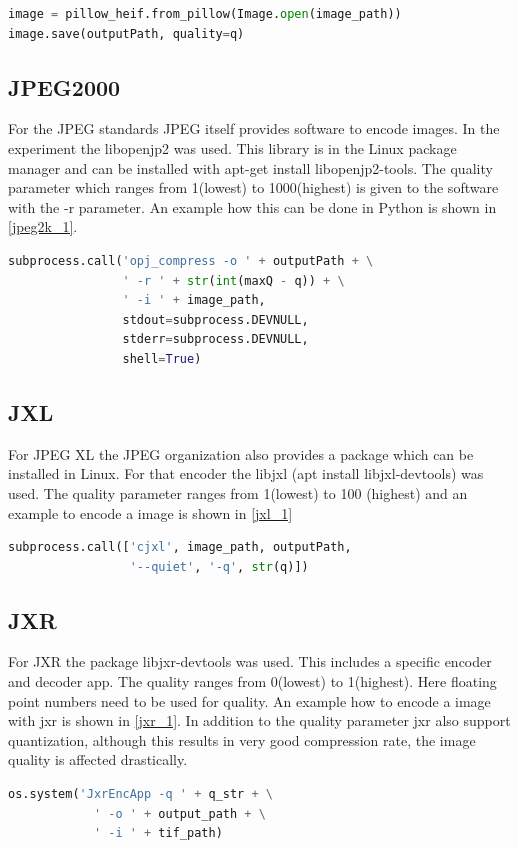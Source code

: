 \documentclass{article}
\begin{document}
\begin{lstlisting}[label={heic_1}, language=Python, caption=Encode HEIC]
image = pillow_heif.from_pillow(Image.open(image_path))
image.save(outputPath, quality=q)
\end{lstlisting}

\subsection{JPEG2000}
For the JPEG standards JPEG itself provides software to encode images. In the experiment the libopenjp2 was used. This library is in the Linux package manager and can be installed with apt-get install libopenjp2-tools. The quality parameter which ranges from 1(lowest) to 1000(highest) is given to the software with the -r parameter. An example how this can be done in Python is shown in \ref{jpeg2k_1}.
\begin{lstlisting}[label={jpeg2k_1}, language=Python, caption=Encode JPEG 2000]
subprocess.call('opj_compress -o ' + outputPath + \
                ' -r ' + str(int(maxQ - q)) + \
                ' -i ' + image_path,
                stdout=subprocess.DEVNULL,
                stderr=subprocess.DEVNULL,
                shell=True)
\end{lstlisting}

\subsection{JXL}
For JPEG XL the JPEG organization also provides a package which can be installed in Linux. For that encoder the libjxl (apt install libjxl-devtools) was used. The quality parameter ranges from 1(lowest) to 100 (highest) and an example to encode a image is shown in \ref{jxl_1}
\begin{lstlisting}[label={jxl_1}, language=Python, caption=Encode JPEG XL]
subprocess.call(['cjxl', image_path, outputPath, 
                 '--quiet', '-q', str(q)])
\end{lstlisting}
\subsection{JXR}
For JXR the package libjxr-devtools was used. This includes a specific encoder and decoder app. The quality ranges from 0(lowest) to 1(highest). Here floating point numbers need to be used for quality.
An example how to encode a image with jxr is shown in \ref{jxr_1}. In addition to the quality parameter jxr also support quantization, although this results in very good compression rate, the image quality is affected drastically. 
\begin{lstlisting}[label={jxr_1}, language=Python, caption=Encode BPG]
os.system('JxrEncApp -q ' + q_str + \
            ' -o ' + output_path + \
            ' -i ' + tif_path)
\end{lstlisting}
\end{document}
